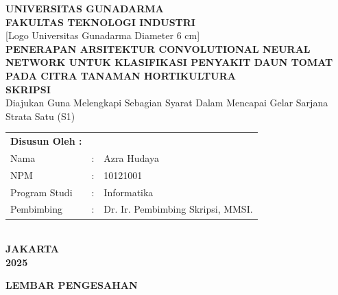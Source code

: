 \documentclass[12pt,a4paper,oneside]{report}
\begin{document}
\pagestyle{plain}

\thispagestyle{empty}
\begin{center}
  {\fontsize{14}{16}\bfseries\MakeUppercase{Universitas Gunadarma}}\\[0.2cm]
  {\fontsize{14}{16}\bfseries\MakeUppercase{Fakultas Teknologi Industri}}\\[1.5cm]

  \vspace{1.5cm}
  {\small [Logo Universitas Gunadarma Diameter 6 cm]}\\[1.5cm]

  {\fontsize{14}{18}\bfseries\MakeUppercase{Penerapan Arsitektur Convolutional Neural Network untuk Klasifikasi Penyakit Daun Tomat pada Citra Tanaman Hortikultura}}\\[1.5cm]

  {\fontsize{14}{16}\bfseries SKRIPSI}\\[0.2cm]
  {\fontsize{12}{14}\selectfont Diajukan Guna Melengkapi Sebagian Syarat Dalam Mencapai Gelar Sarjana Strata Satu (S1)}\\[1.2cm]

  {\fontsize{12}{14}\selectfont
  \begin{tabular}{lcl}
    \textbf{Disusun Oleh :} & & \\
    Nama & : & Azra Hudaya \\
    NPM & : & 10121001 \\
    Program Studi & : & Informatika \\
    Pembimbing & : & Dr. Ir. Pembimbing Skripsi, MMSI.
  \end{tabular}
  }\\[1.5cm]

  \vfill
  {\fontsize{14}{16}\bfseries JAKARTA}\\[0.1cm]
  {\fontsize{14}{16}\bfseries 2025}
\end{center}
\newpage

\thispagestyle{empty}
\begin{center}
  {\fontsize{14}{16}\bfseries LEMBAR PENGESAHAN}\\[1cm]
\end{center}
\end{document}
